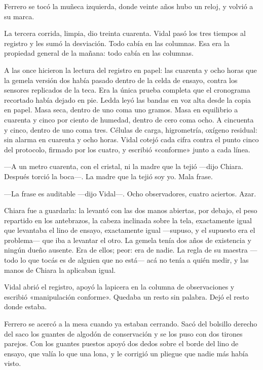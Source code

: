 Ferrero se tocó la muñeca izquierda, donde veinte años hubo un reloj, y volvió a su marca.

La tercera corrida, limpia, dio treinta cuarenta. Vidal pasó los tres tiempos al registro y les sumó la desviación. Todo cabía en las columnas. Esa era la propiedad general de la mañana: todo cabía en las columnas.

A las once hicieron la lectura del registro en papel: las cuarenta y ocho horas que la gemela versión dos había pasado dentro de la celda de ensayo, contra los sensores replicados de la teca. Era la única prueba completa que el cronograma recortado había dejado en pie. Ledda leyó las bandas en voz alta desde la copia en papel. Masa seca, dentro de uno coma uno gramos. Masa en equilibrio a cuarenta y cinco por ciento de humedad, dentro de cero coma ocho. A cincuenta y cinco, dentro de uno coma tres. Células de carga, higrometría, oxígeno residual: sin alarma en cuarenta y ocho horas. Vidal cotejó cada cifra contra el punto cinco del protocolo, firmado por los cuatro, y escribió «conforme» junto a cada línea.

---A un metro cuarenta, con el cristal, ni la madre que la tejió ---dijo Chiara. Después torció la boca---. La madre que la tejió soy yo. Mala frase.

---La frase es auditable ---dijo Vidal---. Ocho observadores, cuatro aciertos. Azar.

Chiara fue a guardarla: la levantó con las dos manos abiertas, por debajo, el peso repartido en los antebrazos, la cabeza inclinada sobre la tela, exactamente igual que levantaba el lino de ensayo, exactamente igual ---supuso, y el supuesto era el problema--- que iba a levantar el otro. La gemela tenía dos años de existencia y ningún dueño ausente. Era de ellos; peor: era de nadie. La regla de su maestra ---todo lo que tocás es de alguien que no está--- acá no tenía a quién medir, y las manos de Chiara la aplicaban igual.

Vidal abrió el registro, apoyó la lapicera en la columna de observaciones y escribió «manipulación conforme». Quedaba un resto sin palabra. Dejó el resto donde estaba.

Ferrero se acercó a la mesa cuando ya estaban cerrando. Sacó del bolsillo derecho del saco los guantes de algodón de conservación y se los puso con dos tirones parejos. Con los guantes puestos apoyó dos dedos sobre el borde del lino de ensayo, que valía lo que una lona, y le corrigió un pliegue que nadie más había visto.

